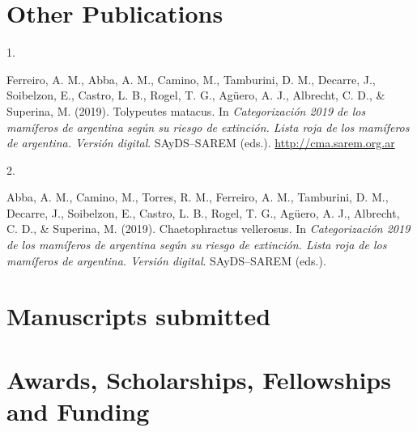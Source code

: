 \documentclass[11pt,a4paper,]{awesome-cv}
\newlength{\csllabelwidth}
\newcommand{\CSLLeftMargin}[1]{\parbox[t]{\csllabelwidth}{#1}}
\newcommand{\CSLRightInline}[1]{\parbox[t]{\linewidth - \csllabelwidth}{#1}}
\begin{document}
\hypertarget{other-publications}{%
\section{Other Publications}\label{other-publications}}

\hypertarget{bibliography}{}
\leavevmode{}%
\CSLLeftMargin{1. }
\CSLRightInline{Ferreiro, A. M., Abba, A. M., Camino, M., Tamburini, D.
M., Decarre, J., Soibelzon, E., Castro, L. B., Rogel, T. G., Agüero, A.
J., Albrecht, C. D., \& Superina, M. (2019). Tolypeutes matacus. In
\emph{Categorización 2019 de los mamíferos de argentina según su riesgo
de extinción. Lista roja de los mamíferos de argentina. Versión
digital}. SAyDS--SAREM (eds.). \url{http://cma.sarem.org.ar}}

\leavevmode{}%
\CSLLeftMargin{2. }
\CSLRightInline{Abba, A. M., Camino, M., Torres, R. M., Ferreiro, A. M.,
Tamburini, D. M., Decarre, J., Soibelzon, E., Castro, L. B., Rogel, T.
G., Agüero, A. J., Albrecht, C. D., \& Superina, M. (2019).
Chaetophractus vellerosus. In \emph{Categorización 2019 de los mamíferos
de argentina según su riesgo de extinción. Lista roja de los mamíferos
de argentina. Versión digital}. SAyDS--SAREM (eds.).}

\hypertarget{manuscripts-submitted}{%
\section{Manuscripts submitted}\label{manuscripts-submitted}}

\begin{cventries}
    \vspace{-4.0mm}
\end{cventries}

\hypertarget{awards-scholarships-fellowships-and-funding}{%
\section{Awards, Scholarships, Fellowships and
Funding}\label{awards-scholarships-fellowships-and-funding}}
\end{document}

